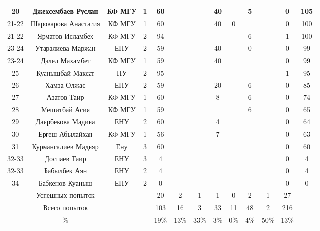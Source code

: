 \begin{center}
\begin{longtable}{|c|c|c|c|*{7}{c|}c|c|}
\hline
20 & Джексембаев Руслан & КФ МГУ&  1 & 60  &  &  & 40  &  & 5  &  & 0 & 105\\
\hline
21-22 & Шароварова Анастасия & КФ МГУ&  1 & 60  &  &  & 40  & 0  &  &  & 0 & 100\\
\hline
21-22 & Ярматов Исламбек & КФ МГУ&  2 &  94   &  &  &  &  & 6  &  & 1 & 100\\
\hline
23-24 & Утаралиева Маржан & ЕНУ&  2 & 59  &  &  & 40  &  & 0  &  & 0 & 99\\
\hline
23-24 & Далел Махамбет & КФ МГУ&  1 & 59  &  &  & 40  &  &  &  & 0 & 99\\
\hline
25 & Куанышбай Максат & НУ &  2 &  95   &  &  &  &  &  &  & 1 & 95\\
\hline
26 & Хамза Олжас & ЕНУ&  2 & 59  &  &  & 20  &  & 6  &  & 0 & 85\\
\hline
27 & Азатов Таир & КФ МГУ&  1 & 60  &  &  & 8  &  & 6  &  & 0 & 74\\
\hline
28 & Мешитбай Асия & КФ МГУ&  1 & 59  &  &  &  &  & 6  &  & 0 & 65\\
\hline
29 & Даирбекова Мадина & ЕНУ&  2 & 60  &  &  & 4  &  &  &  & 0 & 64\\
\hline
30 & Ергеш Абылайхан & КФ МГУ&  1 & 56  &  &  & 7  &  &  &  & 0 & 63\\
\hline
31 & Курмангалиев Мадияр & Ену&  3 & 60  &  &  &  &  &  &  & 0 & 60\\
\hline
32-33 & Доспаев Таир & ЕНУ&  3 & 4  &  &  &  &  &  &  & 0 & 4\\
\hline
32-33 & Бабылбек Аян & ЕНУ&  2 & 4  &  &  &  &  &  &  & 0 & 4\\
\hline
34 & Бабкенов Куаныш & ЕНУ&  2 & 0  &  &  &  &  &  &  & 0 & 0\\
\hline
  & Успешных попыток & & & 20 & 2 & 1 & 1 & 0 & 2 & 1 & 27 &  \\
\hline
  & Всего попыток & & &103 & 16 & 3 & 33 & 11 & 48 & 2 & 216 & \\
\hline
  & \% & & & 19\% & 13\% & 33\% & 3\% & 0\% & 4\% & 50\% & 13\% &  \\
\hline
\end{longtable}
\end{center}
